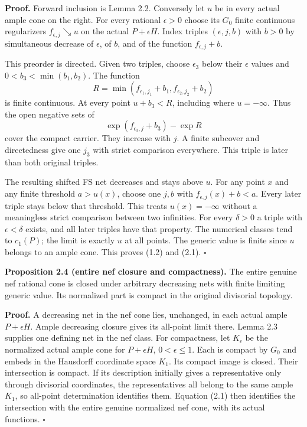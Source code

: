 \documentclass[
  10pt,
]{article}
\begin{document}
\textbf{Proof.} Forward inclusion is Lemma 2.2. Conversely let \(u\) be
in every actual ample cone on the right. For every rational
\(\epsilon>0\) choose its \(G_0\) finite continuous regularizers
\(f_{\epsilon,j}\searrow u\) on the actual \(P+\epsilon H\). Index
triples \((\epsilon,j,b)\) with \(b>0\) by simultaneous decrease of
\(\epsilon\), of \(b\), and of the function \(f_{\epsilon,j}+b\).

This preorder is directed. Given two triples, choose \(\epsilon_3\)
below their \(\epsilon\) values and \(0<b_3<\min(b_1,b_2)\). The
function \[
 R=\min(f_{\epsilon_1,j_1}+b_1,f_{\epsilon_2,j_2}+b_2)
\] is finite continuous. At every point \(u+b_3<R\), including where
\(u=-\infty\). Thus the open negative sets of \[
 \exp(f_{\epsilon_3,j}+b_3)-\exp R
\] cover the compact carrier. They increase with \(j\). A finite
subcover and directedness give one \(j_3\) with strict comparison
everywhere. This triple is later than both original triples.

The resulting shifted FS net decreases and stays above \(u\). For any
point \(x\) and any finite threshold \(a>u(x)\), choose one \(j,b\) with
\(f_{\epsilon,j}(x)+b<a\). Every later triple stays below that
threshold. This treats \(u(x)=-\infty\) without a meaningless strict
comparison between two infinities. For every \(\delta>0\) a triple with
\(\epsilon<\delta\) exists, and all later triples have that property.
The numerical classes tend to \(c_1(P)\); the limit is exactly \(u\) at
all points. The generic value is finite since \(u\) belongs to an ample
cone. This proves (1.2) and (2.1). \(\square\)

\textbf{Proposition 2.4 (entire nef closure and compactness).} The
entire genuine nef rational cone is closed under arbitrary decreasing
nets with finite limiting generic value. Its normalized part is compact
in the original divisorial topology.

\textbf{Proof.} A decreasing net in the nef cone lies, unchanged, in
each actual ample \(P+\epsilon H\). Ample decreasing closure gives its
all-point limit there. Lemma 2.3 supplies one defining net in the nef
class. For compactness, let \(K_\epsilon\) be the normalized actual
ample cone for \(P+\epsilon H\), \(0<\epsilon\leq1\). Each is compact by
\(G_0\) and embeds in the Hausdorff coordinate space \(K_1\). Its
compact image is closed. Their intersection is compact. If its
description initially gives a representative only through divisorial
coordinates, the representatives all belong to the same ample \(K_1\),
so all-point determination identifies them. Equation (2.1) then
identifies the intersection with the entire genuine normalized nef cone,
with its actual functions. \(\square\)
\end{document}
